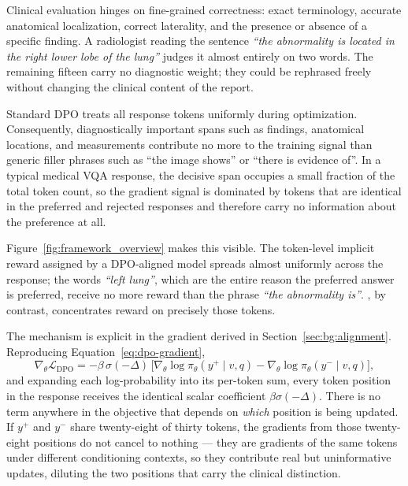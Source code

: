 Clinical evaluation hinges on fine-grained correctness: exact terminology, accurate anatomical localization, correct laterality, and the presence or absence of a specific finding. A radiologist reading the sentence \emph{``the abnormality is located in the right lower lobe of the lung''} judges it almost entirely on two words. The remaining fifteen carry no diagnostic weight; they could be rephrased freely without changing the clinical content of the report.

Standard DPO treats all response tokens uniformly during optimization. Consequently, diagnostically important spans such as findings, anatomical locations, and measurements contribute no more to the training signal than generic filler phrases such as ``the image shows'' or ``there is evidence of''. In a typical medical VQA response, the decisive span occupies a small fraction of the total token count, so the gradient signal is dominated by tokens that are identical in the preferred and rejected responses and therefore carry no information about the preference at all.

Figure~\ref{fig:framework_overview} makes this visible. The token-level implicit reward assigned by a DPO-aligned model spreads almost uniformly across the response; the words \emph{``left lung''}, which are the entire reason the preferred answer is preferred, receive no more reward than the phrase \emph{``the abnormality is''}. \ourloss{}, by contrast, concentrates reward on precisely those tokens.

The mechanism is explicit in the gradient derived in Section~\ref{sec:bg:alignment}. Reproducing Equation~\ref{eq:dpo-gradient},
\begin{equation*}
\nabla_\theta \mathcal{L}_{\text{DPO}} = -\beta\,\sigma(-\Delta)\,\Big[\nabla_\theta \log \pi_\theta(y^+ \mid v,q) - \nabla_\theta \log \pi_\theta(y^- \mid v,q)\Big],
\end{equation*}
and expanding each log-probability into its per-token sum, every token position in the response receives the identical scalar coefficient $\beta\sigma(-\Delta)$. There is no term anywhere in the objective that depends on \emph{which} position is being updated. If $y^+$ and $y^-$ share twenty-eight of thirty tokens, the gradients from those twenty-eight positions do not cancel to nothing --- they are gradients of the same tokens under different conditioning contexts, so they contribute real but uninformative updates, diluting the two positions that carry the clinical distinction.

